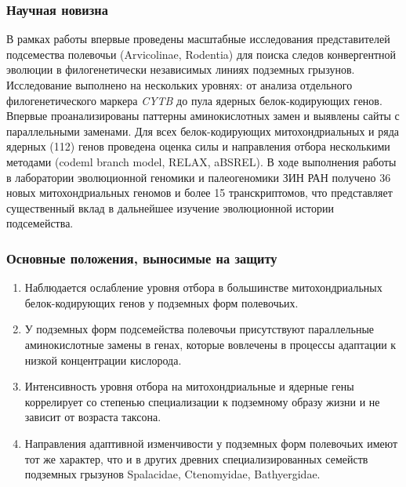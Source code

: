 \subsubsection*{Научная новизна}

В рамках работы впервые проведены масштабные исследования представителей подсемества полевочьи (Arvicolinae, Rodentia) для поиска следов конвергентной эволюции в филогенетически независимых линиях подземных грызунов. Исследование выполнено на нескольких уровнях: от анализа отдельного филогенетического маркера \textit{CYTB} до пула ядерных белок-кодирующих генов. Впервые проанализированы паттерны аминокислотных замен и выявлены сайты с параллельными заменами. Для всех белок-кодирующих митохондриальных и ряда ядерных (112) генов проведена оценка силы и направления отбора несколькими методами (codeml branch model, RELAX, aBSREL). В ходе выполнения работы в лаборатории эволюционной геномики и палеогеномики ЗИН РАН получено 36 новых митохондриальных геномов и более 15 транскриптомов, что представляет существенный вклад в дальнейшее изучение эволюционной истории подсемейства. 
%

\subsubsection*{Основные положения, выносимые на защиту}

\begin{enumerate}
	\item Наблюдается ослабление уровня отбора в большинстве митохондриальных белок-кодирующих генов у подземных форм полевочьих. 
	\item У подземных форм подсемейства полевочьи присутствуют параллельные аминокислотные замены в генах, которые вовлечены в процессы адаптации к низкой концентрации кислорода.
	\item Интенсивность уровня отбора на митохондриальные и ядерные гены коррелирует со степенью специализации к подземному образу жизни и не зависит от возраста таксона.
	\item Направления адаптивной изменчивости у подземных форм полевочьих имеют тот же характер, что и в других древних специализированных семейств подземных грызунов Spalacidae, Ctenomyidae, Bathyergidae.
	 
\end{enumerate}
%

